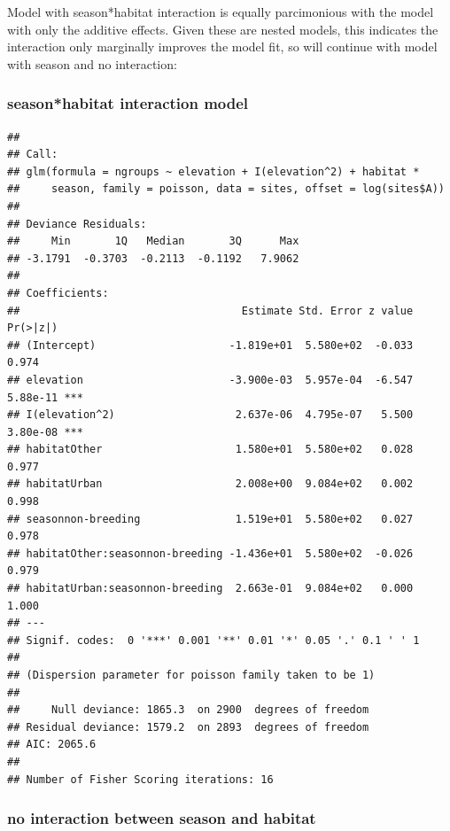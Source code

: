 \documentclass[]{article}
\begin{document}
Model with season*habitat interaction is equally parcimonious with the
model with only the additive effects. Given these are nested models,
this indicates the interaction only marginally improves the model fit,
so will continue with model with season and no interaction:

\subsubsection{season*habitat interaction
model}\label{seasonhabitat-interaction-model}

\begin{verbatim}
## 
## Call:
## glm(formula = ngroups ~ elevation + I(elevation^2) + habitat * 
##     season, family = poisson, data = sites, offset = log(sites$A))
## 
## Deviance Residuals: 
##     Min       1Q   Median       3Q      Max  
## -3.1791  -0.3703  -0.2113  -0.1192   7.9062  
## 
## Coefficients:
##                                   Estimate Std. Error z value Pr(>|z|)    
## (Intercept)                     -1.819e+01  5.580e+02  -0.033    0.974    
## elevation                       -3.900e-03  5.957e-04  -6.547 5.88e-11 ***
## I(elevation^2)                   2.637e-06  4.795e-07   5.500 3.80e-08 ***
## habitatOther                     1.580e+01  5.580e+02   0.028    0.977    
## habitatUrban                     2.008e+00  9.084e+02   0.002    0.998    
## seasonnon-breeding               1.519e+01  5.580e+02   0.027    0.978    
## habitatOther:seasonnon-breeding -1.436e+01  5.580e+02  -0.026    0.979    
## habitatUrban:seasonnon-breeding  2.663e-01  9.084e+02   0.000    1.000    
## ---
## Signif. codes:  0 '***' 0.001 '**' 0.01 '*' 0.05 '.' 0.1 ' ' 1
## 
## (Dispersion parameter for poisson family taken to be 1)
## 
##     Null deviance: 1865.3  on 2900  degrees of freedom
## Residual deviance: 1579.2  on 2893  degrees of freedom
## AIC: 2065.6
## 
## Number of Fisher Scoring iterations: 16
\end{verbatim}

\subsubsection{no interaction between season and
habitat}\label{no-interaction-between-season-and-habitat}
\end{document}

